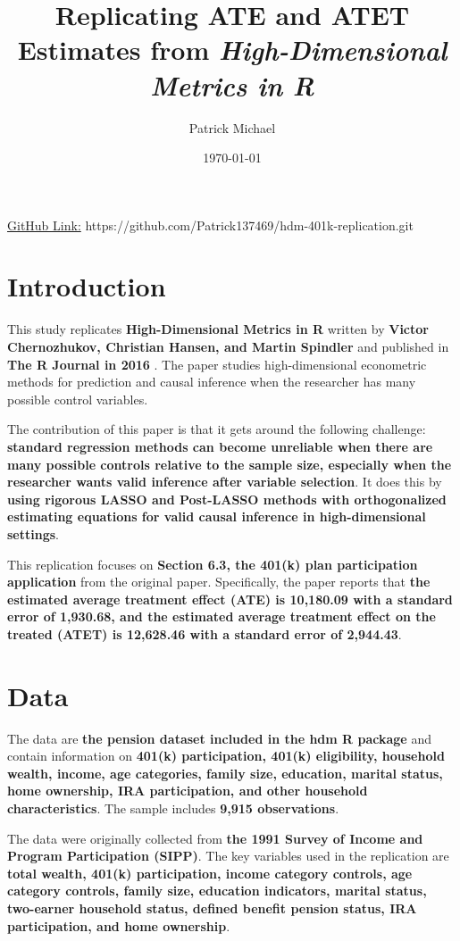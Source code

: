 \documentclass[12pt]{article}
\title{Replicating ATE and ATET Estimates from \textit{High-Dimensional Metrics in R}}
\author{Patrick Michael}
\date{\today}
\begin{document}
\maketitle

\underline{GitHub Link:} https://github.com/Patrick137469/hdm-401k-replication.git

\section{Introduction}

This study replicates \textbf{High-Dimensional Metrics in R} written by \textbf{Victor Chernozhukov, Christian Hansen, and Martin Spindler} and published in \textbf{The R Journal in 2016} \citep{chernozhukov2016hdm}. The paper studies high-dimensional econometric methods for prediction and causal inference when the researcher has many possible control variables.

The contribution of this paper is that it gets around the following challenge: \textbf{standard regression methods can become unreliable when there are many possible controls relative to the sample size, especially when the researcher wants valid inference after variable selection}. It does this by \textbf{using rigorous LASSO and Post-LASSO methods with orthogonalized estimating equations for valid causal inference in high-dimensional settings}.

This replication focuses on \textbf{Section 6.3, the 401(k) plan participation application} from the original paper. Specifically, the paper reports that \textbf{the estimated average treatment effect (ATE) is 10,180.09 with a standard error of 1,930.68, and the estimated average treatment effect on the treated (ATET) is 12,628.46 with a standard error of 2,944.43}.


\section{Data}

The data are \textbf{the pension dataset included in the hdm R package} and contain information on \textbf{401(k) participation, 401(k) eligibility, household wealth, income, age categories, family size, education, marital status, home ownership, IRA participation, and other household characteristics}. The sample includes \textbf{9,915 observations}.

The data were originally collected from \textbf{the 1991 Survey of Income and Program Participation (SIPP)}. The key variables used in the replication are \textbf{total wealth, 401(k) participation, income category controls, age category controls, family size, education indicators, marital status, two-earner household status, defined benefit pension status, IRA participation, and home ownership}.
\end{document}
